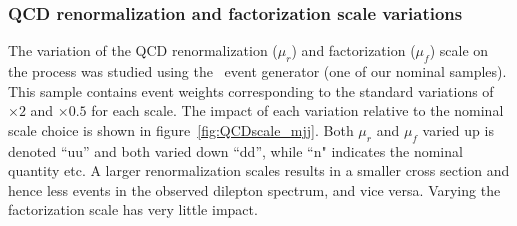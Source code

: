 \subsubsection{QCD renormalization and factorization scale variations}
The variation of the QCD renormalization ($\mu_r$) and factorization ($\mu_f$) scale on the process was studied using the \sherpa\ event generator (one of our nominal samples).
This sample contains event weights corresponding to the standard variations of $\times 2$ and $\times 0.5$ for each scale.
The impact of each variation relative to the nominal scale choice is shown in figure~\ref{fig:QCDscale_mjj}.
Both $\mu_r$ and $\mu_f$ varied up is denoted ``uu'' and both varied down ``dd'', while ``n" indicates the nominal quantity etc.
A larger renormalization scales results in a smaller cross section and hence less events in the observed dilepton \pt spectrum, and vice versa.
Varying the factorization scale has very little impact.

